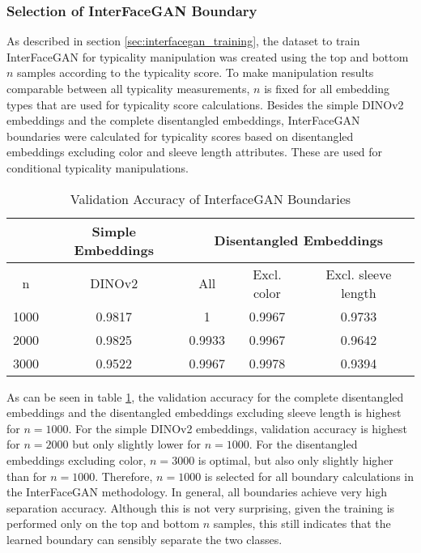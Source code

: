 \subsubsection{Selection of InterFaceGAN Boundary}
As described in section \ref{sec:interfacegan_training}, the dataset to train InterFaceGAN for typicality manipulation was created using the top and bottom $n$ samples according to the typicality score. To make manipulation results comparable between all typicality measurements, $n$ is fixed for all embedding types that are used for typicality score calculations. Besides the simple DINOv2 embeddings and the complete disentangled embeddings, InterFaceGAN boundaries were calculated for typicality scores based on disentangled embeddings excluding color and sleeve length attributes. These are used for conditional typicality manipulations. 

\begin{table}[ht]
\centering
\begin{tabular}{|c|c|c|c|c|}
\hline
    &
    \bfseries Simple Embeddings &
    \multicolumn{3}{c|}{\bfseries Disentangled Embeddings}\\
\hline
n & DINOv2 & All & Excl. color & Excl. sleeve length \\ \hline
 1000 &   0.9817 & 1      &        0.9967 &                0.9733 \\
 2000 &   0.9825 & 0.9933 &        0.9967 &                0.9642 \\
 3000 &   0.9522 & 0.9967 &        0.9978 &                0.9394 \\
 \hline
\end{tabular}
\caption[Validation Accuracy of InterfaceGAN Boundaries]{Validation Accuracy of InterfaceGAN Boundaries}
\label{tab:typicality_accuracy}
\end{table}

As can be seen in table \ref{tab:typicality_accuracy}, the validation accuracy for the complete disentangled embeddings and the disentangled embeddings excluding sleeve length is highest for $n=1000$. For the simple DINOv2 embeddings, validation accuracy is highest for $n=2000$  but only slightly lower for $n=1000$. For the disentangled embeddings excluding color, $n=3000$ is optimal, but also only slightly higher than for $n=1000$. Therefore, $n=1000$ is selected for all boundary calculations in the InterFaceGAN methodology. In general, all boundaries achieve very high separation accuracy. Although this is not very surprising, given the training is performed only on the top and bottom $n$ samples, this still indicates that the learned boundary can sensibly separate the two classes.

